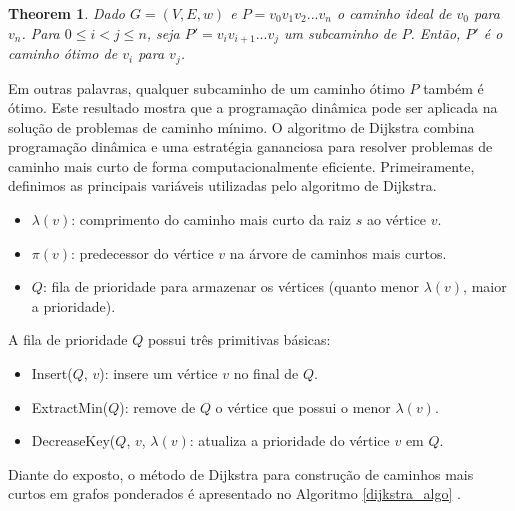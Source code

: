 \documentclass[sn-mathphys,Numbered]{sn-jnl}%
\theoremstyle{thmstyleone}%
\newtheorem{theorem}{Theorem}%
\theoremstyle{thmstyletwo}%
\theoremstyle{thmstylethree}%
\begin{document}
\vspace{0.5cm}
\begin{theorem}
    Dado $G = (V, E, w)$ e $P = v_0 v_1 v_2 ... v_n$ o caminho ideal de $v_0$ para $v_n$. Para $0 \leq i < j \leq n$, seja $P' = v_i v_{i+1} ... v_j$ um subcaminho de $P$. Então, $P'$ é o caminho ótimo de $v_i$ para $v_j$.
\end{theorem}
\vspace{0.5cm}

Em outras palavras, qualquer subcaminho de um caminho ótimo $P$ também é ótimo. Este resultado mostra que a programação dinâmica pode ser aplicada na solução de problemas de caminho mínimo. O algoritmo de Dijkstra combina programação dinâmica e uma estratégia gananciosa para resolver problemas de caminho mais curto de forma computacionalmente eficiente. Primeiramente, definimos as principais variáveis utilizadas pelo algoritmo de Dijkstra.

\begin{itemize}
    \item $\lambda(v)$: comprimento do caminho mais curto da raiz $s$ ao vértice $v$.
    \item $\pi(v)$: predecessor do vértice $v$ na árvore de caminhos mais curtos.
    \item $Q$: fila de prioridade para armazenar os vértices (quanto menor $\lambda(v)$, maior a prioridade).
\end{itemize}

A fila de prioridade $Q$ possui três primitivas básicas:

\begin{itemize}
    \item Insert($Q$, $v$): insere um vértice $v$ no final de $Q$.
    \item ExtractMin($Q$): remove de $Q$ o vértice que possui o menor $\lambda(v)$.
    \item DecreaseKey($Q$, $v$, $\lambda(v)$: atualiza a prioridade do vértice $v$ em $Q$.
\end{itemize} 

Diante do exposto, o método de Dijkstra para construção de caminhos mais curtos em grafos ponderados é apresentado no Algoritmo \ref{dijkstra_algo} \cite{Cormen}.
\end{document}
